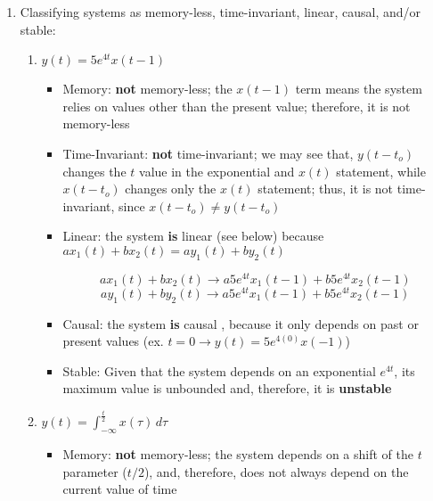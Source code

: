 \begin{enumerate}

  \item Classifying systems as memory-less, time-invariant, linear, causal, and/or stable:

    \begin{enumerate}

      \item $y(t)=5e^{4t}x(t-1)$

        \begin{itemize}

          \item Memory: \textbf{not} memory-less; the $x(t-1)$ term means the system relies on values other than the present value; therefore, it is not memory-less

          \item Time-Invariant: \textbf{not} time-invariant; we may see that, $y(t-t_o)$ changes the $t$ value in the exponential and $x(t)$ statement, while $x(t-t_o)$ changes only the $x(t)$ statement; thus, it is not time-invariant, since $x(t-t_o)\neq y(t-t_o)$

          \item Linear: the system \textbf{is} linear (see below) because $ax_1(t)+bx_2(t)= ay_1(t)+by_2(t)$

            $$ax_1(t)+bx_2(t)\to a5e^{4t}x_1(t-1)+b5e^{4t}x_2(t-1)$$
            $$ay_1(t)+by_2(t)\to a5e^{4t}x_1(t-1)+b5e^{4t}x_2(t-1)$$

          \item Causal: the system \textbf{is} causal , because it only depends on past or present values (ex. $t=0\to y(t)=5e^{4(0)}x(-1)$)

          \item Stable: Given that the system depends on an exponential $e^{4t}$, its maximum value is unbounded and, therefore, it is \textbf{unstable}

        \end{itemize}

      \item $y(t)=\displaystyle \int_{-\infty}^{\frac{t}{2}} x(\tau)\,d\tau$

        \begin{itemize}

          \item Memory: \textbf{not} memory-less; the system depends on a shift of the $t$ parameter ($t/2$), and, therefore, does not always depend on the current value of time


\end{itemize}
\end{enumerate}
\end{enumerate}

